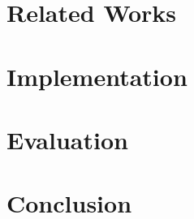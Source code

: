 \documentclass[conference]{IEEEtran}
\begin{document}
\section{Related Works}


\section{Implementation}


\section{Evaluation}


\section{Conclusion}


\printbibliography
\end{document}
